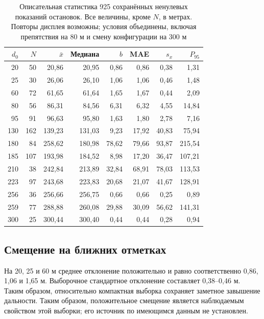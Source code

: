 \documentclass{misisarticle}
\begin{document}
\begin{table}[!t]
\centering
\caption{Описательная статистика 925 сохранённых ненулевых показаний остановок. Все величины, кроме $N$, в метрах. Повторы дисплея возможны; условия объединены, включая препятствия на 80 м и смену конфигурации на 300 м}
\label{tab:results}
\begin{tabular}{rrrrrrrr}
\toprule
$d_0$ & $N$ & $\bar{x}$ & Медиана & $b$ & MAE & $s_x$ & $P_{95}$ \\
\midrule
20 & 50 & 20,86 & 20,95 & 0,86 & 0,86 & 0,38 & 1,31 \\
25 & 30 & 26,06 & 26,10 & 1,06 & 1,06 & 0,46 & 1,48 \\
60 & 72 & 61,65 & 61,64 & 1,65 & 1,67 & 0,44 & 2,09 \\
80 & 56 & 86,31 & 84,56 & 6,31 & 6,32 & 4,55 & 14,84 \\
95 & 91 & 96,63 & 95,80 & 1,63 & 1,80 & 2,78 & 7,16 \\
130 & 162 & 139,23 & 131,03 & 9,23 & 17,92 & 40,83 & 75,94 \\
180 & 84 & 258,62 & 180,98 & 78,62 & 79,66 & 93,87 & 215,54 \\
185 & 107 & 193,98 & 184,52 & 8,98 & 17,20 & 36,47 & 107,21 \\
210 & 38 & 242,84 & 213,89 & 32,84 & 68,91 & 78,03 & 113,53 \\
223 & 97 & 243,68 & 223,83 & 20,68 & 21,07 & 41,67 & 128,91 \\
256 & 36 & 256,66 & 256,75 & 0,66 & 0,66 & 0,25 & 0,89 \\
259 & 77 & 288,88 & 260,08 & 29,88 & 30,09 & 56,62 & 141,31 \\
300 & 25 & 300,44 & 300,40 & 0,44 & 0,44 & 0,28 & 0,94 \\
\bottomrule
\end{tabular}
\end{table}

\subsection{Смещение на ближних отметках}

На 20, 25 и 60 м среднее отклонение положительно и равно соответственно 0,86, 1,06 и 1,65 м. Выборочное стандартное отклонение составляет 0,38--0,46 м. Таким образом, относительно компактная выборка сохраняет заметное завышение дальности. Таким образом, положительное смещение является наблюдаемым свойством этой выборки; его источник по имеющимся данным не установлен.
\end{document}
